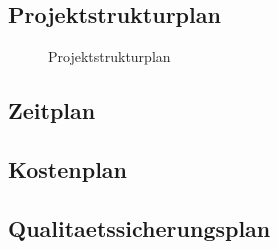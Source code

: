 \documentclass[11pt, a4paper]{article}
\begin{document}
    \subsection{Projektstrukturplan}
      \begin{figure}[h!]
        \caption{Projektstrukturplan}
        \label{fig:psp}
      \end{figure}
      \newpage

    \subsection{Zeitplan}
      
      \newpage

    \subsection{Kostenplan}
      
      \newpage

    \subsection{Qualitaetssicherungsplan}
      
      \newpage
\end{document}
